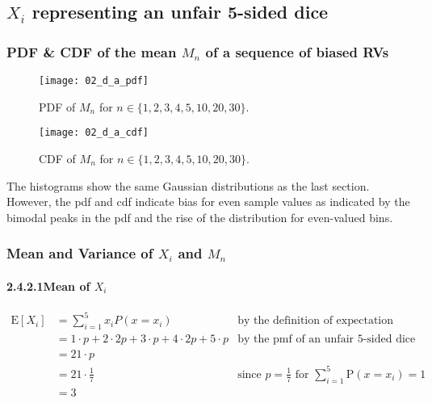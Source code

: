 \documentclass[12pt, a4paper, titlepage, fleqn]{article}
\begin{document}
\pagebreak 

\subsection{$X_i$ representing an unfair 5-sided dice}

\subsubsection{PDF \& CDF of the mean $M_n$ of a sequence of biased RVs}

\begin{figure}[h!]
	\centering
	\texttt{[image: 02\_d\_a\_pdf]}
	\vspace{-24pt}
	\caption{PDF of $M_n$ for $n \in \{1,2,3,4,5,10,20,30\}$.} 
	\label{fig:biased mean pdf}
	\vspace{16pt}
	\texttt{[image: 02\_d\_a\_cdf]}
	\vspace{-24pt}
	\caption{CDF of $M_n$ for $n \in \{1,2,3,4,5,10,20,30\}$.}
	\label{fig:biased mean cdf}
\end{figure}

\vspace{-8pt}

\begin{flushleft}
The histograms show the same Gaussian distributions as the last section. However, the pdf and cdf indicate bias for even sample values as indicated by the bimodal peaks in the pdf and the rise of the distribution for even-valued bins. 
\end{flushleft}

\subsubsection{Mean and Variance of $X_i$ and $M_n$}

\paragraph{2.4.2.1\quad Mean of $X_i$}
\begin{align}
	\text{E}[X_i] &= \sum_{i=1}^{5} x_i P(x=x_i) &\text{by the definition of expectation}
	\\
	&= 1 \cdot p + 2 \cdot 2p + 3 \cdot p + 4 \cdot 2p + 5 \cdot p &\text{by the pmf of an unfair 5-sided dice}
	\\
	&= 21 \cdot p
	\\
	&= 21 \cdot \frac{1}{7}	&\text{since $p=\frac{1}{7}$ for $\sum_{i=1}^{5} \text{P}(x=x_i) = 1$}
	\\
	&= 3
\end{align}
\end{document}
